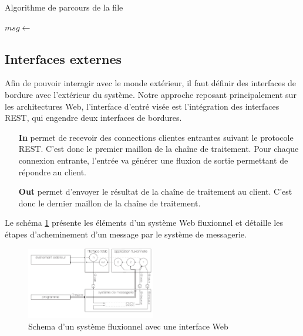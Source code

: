 \begin{algorithm}
\caption{Algorithme de parcours de la file}
\label{alg:parcours}
\begin{algorithmic}
\State $msg \gets$  
\State {}
\EndWhile
\EndFunction
\end{algorithmic}
\end{algorithm}

\subsection{Interfaces externes}

Afin de pouvoir interagir avec le monde extérieur, il faut définir des interfaces de bordure avec l'extérieur du système.
Notre approche reposant principalement sur les architectures Web, l'interface d'entré visée est l'intégration des interfaces REST, qui engendre deux interfaces de bordures.


\begin{itemize}
	\item[\textbf{In}]
    permet de recevoir des connections clientes entrantes suivant le protocole REST.
    C'est donc le premier maillon de la chaîne de traitement.
    Pour chaque connexion entrante, l'entrée va générer une fluxion de sortie permettant de répondre au client.
	\item[\textbf{Out}]
    permet d'envoyer le résultat de la chaîne de traitement au client.
    C'est donc le dernier maillon de la chaîne de traitement.
\end{itemize}


Le schéma \ref{fig:schemaweb} présente les éléments d'un système Web fluxionnel et détaille les étapes d'acheminement d'un message par le système de messagerie.

\begin{figure}[h!]
	\includegraphics[width=0.5\textwidth]{schema-web.pdf}
	\caption{Schema d'un système fluxionnel avec une interface Web}
	\label{fig:schemaweb}
\end{figure}

